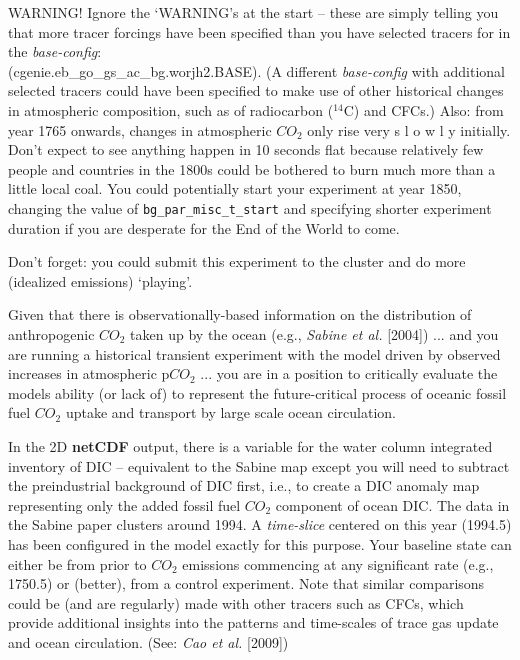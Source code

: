 \documentclass[11pt,fleqn]{book} %
\begin{document}
WARNING! Ignore the ‘WARNING’s at the start -- these are simply telling you that more tracer forcings have been specified than you have selected tracers for in the \textit{base-config}: \\(\textsf{\footnotesize cgenie.eb\_go\_gs\_ac\_bg.worjh2.BASE}). (A different \textit{base-config} with additional selected tracers could have been specified to make use of other historical changes in atmospheric composition, such as of radiocarbon ($^{14}$C) and CFCs.) Also: from year 1765 onwards, changes in atmospheric \(CO_{2}\) only rise very s l o w l y initially. Don’t expect to see anything happen in 10 seconds flat because relatively few people and countries in the 1800s could be bothered to burn much more than a little local coal. You could potentially start your experiment at year 1850, changing the value of \texttt{bg\_par\_misc\_t\_start} and specifying shorter experiment duration if you are desperate for the End of the World to come.

Don’t forget: you could submit this experiment to the cluster and do more (idealized emissions) ‘playing’.


\noindent Given that there is observationally-based information on the distribution of anthropogenic \(CO_{2}\) taken up by the ocean (e.g., \textit{Sabine et al.} [2004]) ... and you are running a historical transient experiment with the model driven by observed increases in atmospheric p\(CO_{2}\) ... you are in a position to critically evaluate the models ability (or lack of) to represent the future-critical process of oceanic fossil fuel \(CO_{2}\) uptake and transport by large scale ocean circulation.

In the 2D \textbf{netCDF} output, there is a variable for the water column integrated inventory of DIC – equivalent to the Sabine map except you will need to subtract the preindustrial background of DIC first, i.e., to create a DIC anomaly map representing only the added fossil fuel \(CO_{2}\) component of ocean DIC. The data in the Sabine paper clusters around 1994. A \textit{time-slice} centered on this year (1994.5) has been configured in the model exactly for this purpose. Your baseline state can either be from prior to \(CO_{2}\) emissions commencing at any significant rate (e.g., 1750.5) or (better), from a control experiment. Note that similar comparisons could be (and are regularly) made with other tracers such as CFCs, which provide additional insights into the patterns and time-scales of trace gas update and ocean circulation. (See: \textit{Cao et al.} [2009])
\end{document}
